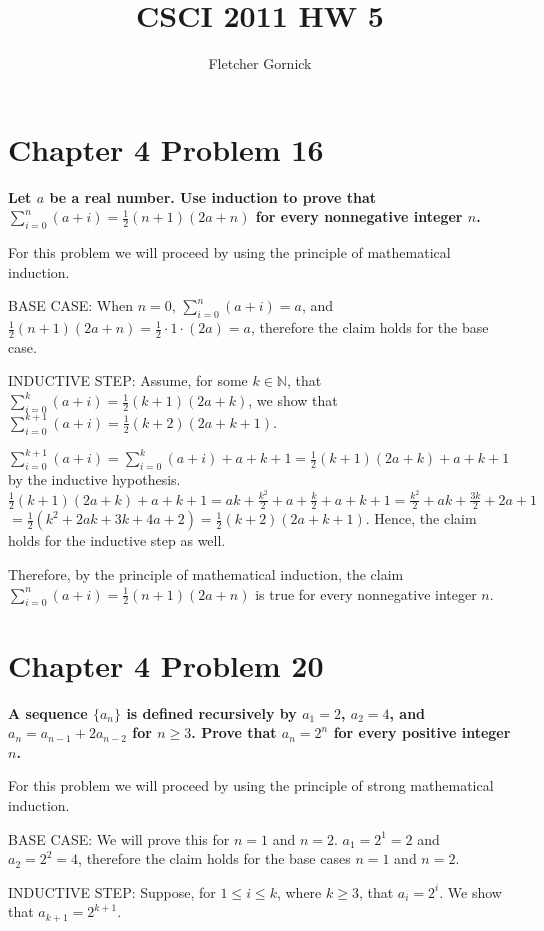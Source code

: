 \documentclass[10pt]{article}
\title{CSCI 2011 HW 5}
\author{Fletcher Gornick}
\def \n {\par \vspace{\baselineskip}}
\begin{document}
\maketitle

\section{Chapter 4 Problem 16}
\textbf{Let $a$ be a real number.  Use induction to prove that $\sum_{i=0}^{n} (a + i) = \frac12 (n + 1)(2a + n)$
for every nonnegative integer $n$.}

For this problem we will proceed by using the principle of mathematical induction.

\n BASE CASE: When $n = 0$, $\sum_{i=0}^{n} (a + i) = a$, and $\frac12(n + 1)(2a + n) = \frac12 \cdot 1 \cdot (2a) = a$, therefore the 
claim holds for the base case.

\n INDUCTIVE STEP: Assume, for some $k \in \mathbb{N}$, that $\sum_{i=0}^{k} (a + i) = \frac12 (k + 1)(2a + k)$, we show that 
$\sum_{i=0}^{k + 1} (a + i) = \frac12 (k + 2)(2a + k + 1)$. 

\n $\sum_{i=0}^{k + 1} (a + i) = \sum_{i=0}^{k} (a + i) + a + k + 1 = \frac12 (k + 1)(2a + k) + a + k + 1$ by the inductive hypothesis.
$\frac12 (k + 1)(2a + k) + a + k + 1 = ak + \frac{k^2}2 + a + \frac{k}{2} + a + k + 1 = \frac{k^2}2 + ak + \frac{3k}{2} + 2a + 1$
$ = \frac12(k^2 + 2ak + 3k + 4a + 2) = \frac12(k + 2)(2a + k + 1)$.  Hence, the claim holds for the inductive step as well.

\n Therefore, by the principle of mathematical induction, the claim $\sum_{i=0}^{n} (a + i) = \frac12 (n + 1)(2a + n)$ is true for every 
nonnegative integer $n$.



\section{Chapter 4 Problem 20}
\textbf{A sequence $\{a_n\}$ is defined recursively by $a_1 = 2$, $a_2 = 4$, and $a_n = a_{n-1} + 2a_{n-2}$ for $n \geq 3$.
Prove that $a_n = 2^n$ for every positive integer $n$.}

For this problem we will proceed by using the principle of strong mathematical induction. 

\n BASE CASE: We will prove this for $n = 1$ and $n = 2$.  $a_1 = 2^1 = 2$ and $a_2 = 2^2 = 4$, therefore the claim holds for the base 
cases $n = 1$ and $n = 2$.

\n INDUCTIVE STEP: Suppose, for $1 \leq i \leq k$, where $k \geq 3$, that $a_i = 2^i$.  We show that $a_{k + 1} = 2^{k + 1}$.
\end{document}

